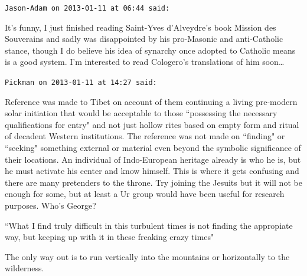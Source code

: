 \begin{footnotesize}
\begin{sffamily}
\texttt{Jason-Adam on 2013-01-11 at 06:44 said: }

It's funny, I just finished reading Saint-Yves d'Alveydre's book Mission des Souverains and sadly was disappointed by his pro-Masonic and anti-Catholic stance, though I do believe his idea of synarchy once adopted to Catholic means is a good system. I'm interested to read Cologero's translations of him soon…


\hfill

\texttt{Pickman on 2013-01-11 at 14:27 said: }

Reference was made to Tibet on account of them continuing a living pre-modern solar initiation that would be acceptable to those ``possessing the necessary qualifications for entry" and not just hollow rites based on empty form and ritual of decadent Western institutions. The reference was not made on ``finding" or ``seeking" something external or material even beyond the symbolic significance of their locations. An individual of Indo-European heritage already is who he is, but he must activate his center and know himself. This is where it gets confusing and there are many pretenders to the throne. Try joining the Jesuits but it will not be enough for some, but at least a Ur group would have been useful for research purposes. Who's George? 

``What I find truly difficult in this turbulent times is not finding the appropiate way, but keeping up with it in these freaking crazy times"

The only way out is to run vertically into the mountains or horizontally to the wilderness.


\end{sffamily}\end{footnotesize}
